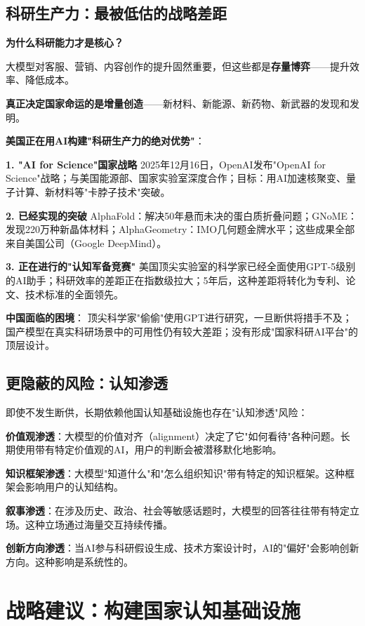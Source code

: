 \subsection{科研生产力：最被低估的战略差距}

\textbf{为什么科研能力才是核心？}

大模型对客服、营销、内容创作的提升固然重要，但这些都是\textbf{存量博弈}——提升效率、降低成本。

\textbf{真正决定国家命运的是增量创造}——新材料、新能源、新药物、新武器的发现和发明。

\textbf{美国正在用AI构建"科研生产力的绝对优势"}：

\textbf{1. "AI for Science"国家战略}
2025年12月16日，OpenAI发布"OpenAI for Science"战略；与美国能源部、国家实验室深度合作；目标：用AI加速核聚变、量子计算、新材料等"卡脖子技术"突破。

\textbf{2. 已经实现的突破}
AlphaFold：解决50年悬而未决的蛋白质折叠问题；GNoME：发现220万种新晶体材料；AlphaGeometry：IMO几何题金牌水平；这些成果全部来自美国公司（Google DeepMind）。

\textbf{3. 正在进行的"认知军备竞赛"}
美国顶尖实验室的科学家已经全面使用GPT-5级别的AI助手；科研效率的差距正在指数级拉大；5年后，这种差距将转化为专利、论文、技术标准的全面领先。

\textbf{中国面临的困境}：
顶尖科学家"偷偷"使用GPT进行研究，一旦断供将措手不及；国产模型在真实科研场景中的可用性仍有较大差距；没有形成"国家科研AI平台"的顶层设计。

\subsection{更隐蔽的风险：认知渗透}

即使不发生断供，长期依赖他国认知基础设施也存在"认知渗透"风险：

\textbf{价值观渗透}：大模型的价值对齐（alignment）决定了它"如何看待"各种问题。长期使用带有特定价值观的AI，用户的判断会被潜移默化地影响。

\textbf{知识框架渗透}：大模型"知道什么"和"怎么组织知识"带有特定的知识框架。这种框架会影响用户的认知结构。

\textbf{叙事渗透}：在涉及历史、政治、社会等敏感话题时，大模型的回答往往带有特定立场。这种立场通过海量交互持续传播。

\textbf{创新方向渗透}：当AI参与科研假设生成、技术方案设计时，AI的"偏好"会影响创新方向。这种影响是系统性的。

\section{战略建议：构建国家认知基础设施}

